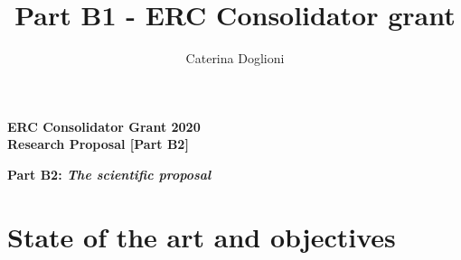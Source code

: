 \documentclass[11pt,a4paper]{article}
\title{{\Large Part B1 - ERC Consolidator grant}}
\author{{\normalsize Caterina Doglioni}}
\date{}                                           %
\begin{document}
\begin{center} 

{\Large\bf ERC Consolidator Grant 2020} \\
 {\Large\bf Research Proposal [Part B2]}  \\
\vspace{0.5cm} 
\end{center} 

{\Large{\bf Part B2: {\it{The scientific proposal}}}}

\section{State of the art and objectives}
%








\end{document}
